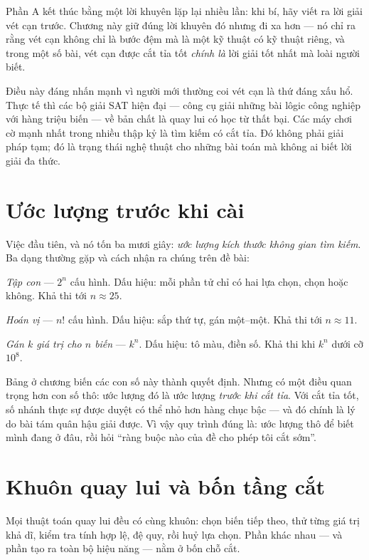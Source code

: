 \documentclass[../../algorithm.tex]{subfiles}
\begin{document}
Phần A kết thúc bằng một lời khuyên lặp lại nhiều lần: khi bí, hãy viết ra lời giải vét cạn trước. Chương này giữ đúng lời khuyên đó nhưng đi xa hơn --- nó chỉ ra rằng vét cạn không chỉ là bước đệm mà là một kỹ thuật có kỹ thuật riêng, và trong một số bài, vét cạn được cắt tỉa tốt \emph{chính là} lời giải tốt nhất mà loài người biết.

Điều này đáng nhấn mạnh vì người mới thường coi vét cạn là thứ đáng xấu hổ. Thực tế thì các bộ giải SAT hiện đại --- công cụ giải những bài lôgic công nghiệp với hàng triệu biến --- về bản chất là quay lui có học từ thất bại. Các máy chơi cờ mạnh nhất trong nhiều thập kỷ là tìm kiếm có cắt tỉa. Đó không phải giải pháp tạm; đó là trạng thái nghệ thuật cho những bài toán mà không ai biết lời giải đa thức.

\section{Ước lượng trước khi cài}

Việc đầu tiên, và nó tốn ba mươi giây: \emph{ước lượng kích thước không gian tìm kiếm}. Ba dạng thường gặp và cách nhận ra chúng trên đề bài:

\emph{Tập con} --- \(2^n\) cấu hình. Dấu hiệu: mỗi phần tử chỉ có hai lựa chọn, chọn hoặc không. Khả thi tới \(n \approx 25\).

\emph{Hoán vị} --- \(n!\) cấu hình. Dấu hiệu: sắp thứ tự, gán một--một. Khả thi tới \(n \approx 11\).

\emph{Gán \(k\) giá trị cho \(n\) biến} --- \(k^n\). Dấu hiệu: tô màu, điền số. Khả thi khi \(k^n\) dưới cỡ \(10^8\).

Bảng ở chương  biến các con số này thành quyết định. Nhưng có một điều quan trọng hơn con số thô: ước lượng đó là ước lượng \emph{trước khi cắt tỉa}. Với cắt tỉa tốt, số nhánh thực sự được duyệt có thể nhỏ hơn hàng chục bậc --- và đó chính là lý do bài tám quân hậu giải được. Vì vậy quy trình đúng là: ước lượng thô để biết mình đang ở đâu, rồi hỏi ``ràng buộc nào của đề cho phép tôi cắt sớm''.

\section{Khuôn quay lui và bốn tầng cắt}

Mọi thuật toán quay lui đều có cùng khuôn: chọn biến tiếp theo, thử từng giá trị khả dĩ, kiểm tra tính hợp lệ, đệ quy, rồi huỷ lựa chọn. Phần khác nhau --- và phần tạo ra toàn bộ hiệu năng --- nằm ở bốn chỗ cắt.
\end{document}
